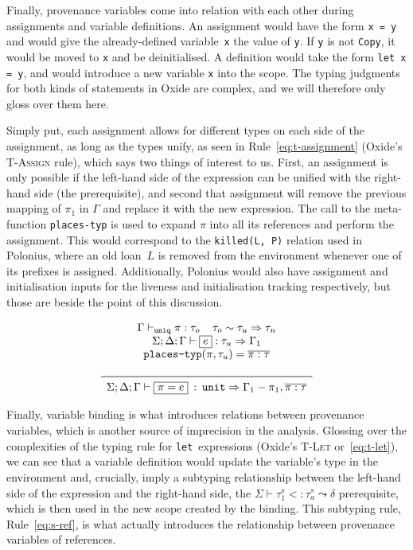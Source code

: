 \documentclass[11pt,a4paper,twoside,openany]{report}
\newcommand{\InRust}[1]{\texttt{#1}}
\newcommand{\InDatalog}[1]{\texttt{#1}}
\newcommand{\expression}[1]{\boxed{#1}}
\newcommand{\ntyperule}[2]{\begin{array}{c}#1\\\midrule\raisebox{1pt}{\strut}#2\end{array}}
\begin{document}
Finally, provenance variables come into relation with each other during
assignments and variable definitions. An assignment would have the form
\InRust{x = y} and would give the already-defined variable~\InRust{x} the value
of \InRust{y}. If \InRust{y} is not \InRust{Copy}, it would be moved to
\InRust{x} and be deinitialised. A definition would take the form \InRust{let x
  = y}, and would introduce a new variable \InRust{x} into the scope. The typing
judgments for both kinds of statements in Oxide are complex, and we will
therefore only gloss over them here.

Simply put, each assignment allows for different types on each side of the
assignment, as long as the types unify, as seen in Rule~\eqref{eq:t-assignment}
(Oxide's \textsc{T-Assign} rule), which says two things of interest to us.
First, an assignment is only possible if the left-hand side of the expression
can be unified with the right-hand side (the prerequisite), and second that
assignment will remove the previous mapping of $\pi_1$ in $\Gamma$ and replace
it with the new expression. The call to the meta-function \texttt{places-typ} is
used to expand $\pi$ into all its references and perform the assignment. This
would correspond to the \InDatalog{killed(L, P)} relation used in Polonius,
where an old loan~$L$ is removed from the environment whenever one of its prefixes
is assigned. Additionally, Polonius would also have assignment and
initialisation inputs for the liveness and initialisation tracking respectively,
but those are beside the point of this discussion.

\begin{equation}\label{eq:t-assignment}
  \ntyperule{
    \Gamma \vdash_{\texttt{uniq}} \pi : \tau_o \:\:\:\:\:
    \tau_o \sim \tau_u \Rightarrow \tau_n \\
    \Sigma ; \Delta ; \Gamma \vdash \expression{e} : \tau_u \Rightarrow \Gamma_1 \\
    \texttt{places-typ}(\pi, \tau_u) = \overline{\pi : \tau} \\
  }
  {
    \Sigma ; \Delta ; \Gamma \vdash \expression{\pi = e} \: : \: \texttt{unit} \Rightarrow \Gamma_1 - \pi_1, \overline{\pi : \tau}
  }
\end{equation}

Finally, variable binding is what introduces relations between provenance
variables, which is another source of imprecision in the analysis. Glossing over
the complexities of the typing rule for \InRust{let}~expressions (Oxide's
\textsc{T-Let} or~\eqref{eq:t-let}), we can see that a variable definition would
update the variable's type in the environment and, crucially, imply a
subtyping relationship between the left-hand side of the expression and the
right-hand side, the $\Sigma \vdash \tau_1 ^s <: \tau_a^s \leadsto \delta$
prerequisite, which is then used in the new scope created by the binding. This
subtyping rule, Rule~\eqref{eq:s-ref}, is what actually introduces the
relationship between provenance variables of references.
\end{document}
